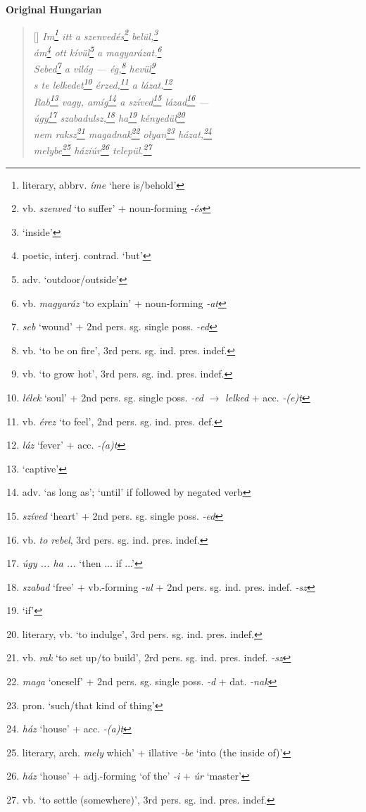 \documentclass[a4paper,12pt,twoside,final]{book}
\begin{document}
\newpage


\noindent \textbf{Original Hungarian}



\settowidth{\versewidth}{nem raksz magadnak olyan házat,}

\begin{verse}[\versewidth]
  \it
  Im\footnote{literary, abbrv. \emph{íme} `here is/behold'}
  itt a szenvedés\footnote{vb. \emph{szenved} `to suffer'
  + noun-forming \emph{-és}} belül,\footnote{`inside'} \\
  ám\footnote{poetic, interj. contrad. `but'} ott
  kívül\footnote{adv. `outdoor/outside'} a
  magyarázat.\footnote{vb. \emph{magyaráz} `to explain' +
  noun-forming \emph{-at}} \\
  Sebed\footnote{\emph{seb} `wound' + 2nd
  pers. sg. single poss. \emph{-ed}} a világ --- ég,\footnote{vb.
  `to be on fire', 3rd pers. sg. ind. pres. indef.}
  hevül\footnote{vb. `to grow hot', 3rd
  pers. sg. ind. pres. indef.} \\
  s te lelkedet\footnote{\emph{lélek} `soul' + 2nd
  pers. sg. single poss. \emph{-ed} $\rightarrow$ \emph{lelked} +
  acc. \emph{-(e)t}} érzed,\footnote{vb. \emph{érez} `to feel', 2nd
  pers. sg. ind. pres. def.} a lázat.\footnote{\emph{láz} `fever' +
  acc. \emph{-(a)t}} \\
  Rab\footnote{`captive'} vagy, amíg\footnote{adv. `as long as';
  `until' if followed by negated verb} a
  szíved\footnote{\emph{szíved} `heart' + 2nd pers. sg. single
  poss. \emph{-ed}} lázad\footnote{vb. \emph{to rebel}, 3rd
  pers. sg. ind. pres. indef.} --- \\
  úgy\footnote{\emph{úgy ... ha ...} `then ... if ...'}
  szabadulsz,\footnote{\emph{szabad} `free' + vb.-forming \emph{-ul}
  + 2nd pers. sg. ind. pres. indef. \emph{-sz}} ha\footnote{`if'}
  kényedül\footnote{literary, vb. `to indulge', 3rd
  pers. sg. ind. pres. indef.} \\
  nem raksz\footnote{vb. \emph{rak} `to set up/to build', 2rd
  pers. sg. ind. pres. indef. \emph{-sz}}
  magadnak\footnote{\emph{maga} `oneself' + 2nd pers. sg. single
  poss. \emph{-d} + dat. \emph{-nak}}
  olyan\footnote{pron. `such/that kind of thing'}
  házat,\footnote{\emph{ház} `house' + acc. \emph{-(a)t}} \\
  melybe\footnote{literary, arch. \emph{mely}
   which' + illative \emph{-be} `into (the inside of)'}
  háziúr\footnote{\emph{ház} `house' + adj.-forming `of the'
  \emph{-i} + \emph{úr} `master'} települ.\footnote{vb. `to
  settle (somewhere)', 3rd pers. sg. ind. pres. indef.} \\
\end{verse}
\end{document}
